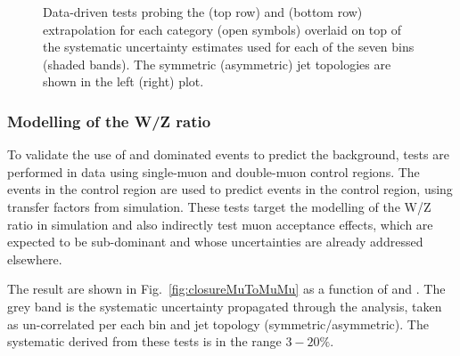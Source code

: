 \begin{figure}[h!]
\begin{center}
    \caption{Data-driven tests probing the \alphat (top row) and \bdphi (bottom row) extrapolation for each
      \njet category (open symbols) overlaid on top of the systematic
      uncertainty estimates used for each of the seven \scalht bins (shaded bands). 
      The symmetric (asymmetric) jet topologies are shown in the left (right) plot. 
    }
    \label{fig:closureAlphaT}
  \end{center} 
\end{figure}

\subsubsection*{Modelling of the W/Z ratio}
\label{sec:tfSyst_WZratio}
To validate the use of \wmj and \ttbar dominated \mj events to predict
the \znunu background, tests are performed in data using single-muon
and double-muon control regions.  The events in the \mj control region are
used to predict events in the \mmj control region, using transfer
factors from simulation.  These tests target the modelling of the W/Z
ratio in simulation and also indirectly test muon acceptance effects,
which are expected to be sub-dominant and whose uncertainties are
already addressed elsewhere.

The result are shown in Fig.~\ref{fig:closureMuToMuMu} as a function
of \scalht and \njet.  The grey band is the systematic uncertainty
propagated through the analysis, taken as un-correlated per each
\scalht bin and jet topology (symmetric/asymmetric). The systematic
derived from these tests is in the range $3-20\%$.


